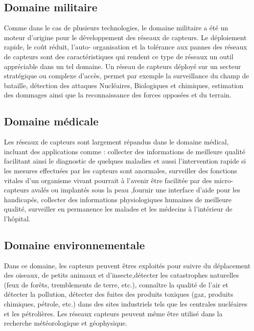 \subsection{Domaine militaire}
Comme dans le cas de plusieurs technologies, le domaine militaire a été un moteur d'origine 	pour le développement des réseaux de capteurs. Le déploiement rapide, le coût réduit, l'auto-	organisation et la tolérance aux pannes des réseaux de capteurs sont des caractéristiques qui 	rendent ce type de réseaux un outil appréciable dans un tel domaine. \cite{mekidicheetude}
	Un réseau de capteurs déployé sur un secteur stratégique ou complexe d'accès, permet par 	exemple la surveillance du champ de bataille, détection des attaques Nucléaires, Biologiques 	et chimiques, estimation des dommages ainsi que la reconnaissance des forces opposées et 	du terrain. \\

\subsection{Domaine médicale}
Les réseaux de capteurs sont largement répandus dans le domaine médical, incluant des 	applications comme : collecter des informations de meilleure qualité facilitant ainsi le diagnostic de quelques maladies et aussi l’intervention rapide si les mesures effectuées par 	les capteurs sont anormales, surveiller des fonctions vitales d'un organisme vivant pourrait à 	l'avenir être facilitée par des micro-capteurs avalés ou implantés sous la peau ,fournir une 	interface d'aide pour les handicapés, collecter des informations physiologiques humaines de 	meilleure qualité, surveiller en permanence les malades et les médecins à l'intérieur de 	l'hôpital.\\


\subsection{Domaine environnementale}
Dans ce domaine, les capteurs peuvent êtres exploités pour suivre du déplacement des 	oiseaux, de petits animaux et d’insecte,détecter les catastrophes naturelles (feux de forêts, 	tremblements de terre, etc.), connaître la qualité de l’air et détecter la pollution, détecter des 	fuites des produits toxiques (gaz, produits chimiques, pétrole, etc.) dans des sites industriels 	tels que les centrales nucléaires et les pétrolières. Les réseaux capteurs peuvent même être 	utilisé dans la recherche météorologique et géophysique.\\

